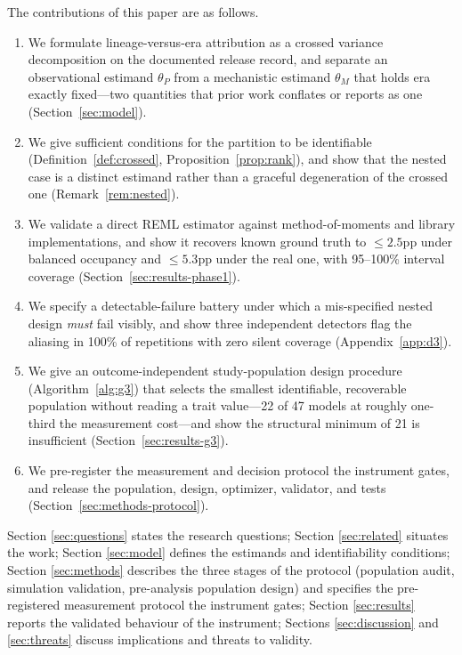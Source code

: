 \documentclass{ieeeaccess}
\theoremstyle{definition}
\theoremstyle{plain}
\begin{document}
The contributions of this paper are as follows.
\begin{enumerate}
\item We formulate lineage-versus-era attribution as a crossed variance
  decomposition on the documented release record, and separate an observational
  estimand $\theta_{P}$ from a mechanistic estimand $\theta_{M}$ that holds era
  exactly fixed---two quantities that prior work conflates or reports as one
  (Section~\ref{sec:model}).
\item We give sufficient conditions for the partition to be identifiable
  (Definition~\ref{def:crossed}, Proposition~\ref{prop:rank}), and show that the
  nested case is a distinct estimand rather than a graceful degeneration of the
  crossed one (Remark~\ref{rem:nested}).
\item We validate a direct REML estimator against method-of-moments and library
  implementations, and show it recovers known ground truth to $\le2.5$pp under
  balanced occupancy and $\le5.3$pp under the real one, with 95--100\% interval
  coverage (Section~\ref{sec:results-phase1}).
\item We specify a detectable-failure battery under which a mis-specified
  nested design \emph{must} fail visibly, and show three independent detectors
  flag the aliasing in 100\% of repetitions with zero silent coverage
  (Appendix~\ref{app:d3}).
\item We give an outcome-independent study-population design procedure
  (Algorithm~\ref{alg:g3}) that selects the smallest identifiable, recoverable
  population without reading a trait value---22 of 47 models at roughly
  one-third the measurement cost---and show the structural minimum of 21 is
  insufficient (Section~\ref{sec:results-g3}).
\item We pre-register the measurement and decision protocol the instrument
  gates, and release the population, design, optimizer, validator, and tests
  (Section~\ref{sec:methods-protocol}).
\end{enumerate}

Section \ref{sec:questions} states the research
questions; Section \ref{sec:related} situates the work; Section
\ref{sec:model} defines the estimands and identifiability conditions; Section
\ref{sec:methods} describes the three stages of the protocol (population audit,
simulation validation, pre-analysis population design) and specifies the
pre-registered measurement protocol the instrument gates; Section
\ref{sec:results} reports the validated behaviour of the instrument; Sections
\ref{sec:discussion} and \ref{sec:threats} discuss implications and threats to
validity.
\end{document}
